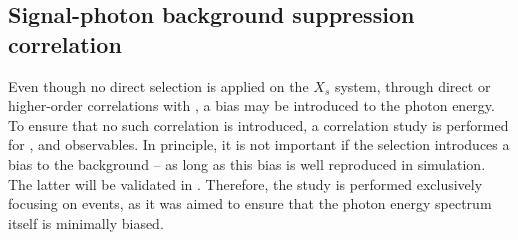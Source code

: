 \subsection{Signal-photon background suppression correlation}\label{sec:signal_photon_correlation}

Even though no direct selection is applied on the $X_s$ system, through direct or higher-order correlations with \EB, a bias may be introduced to the photon energy.
To ensure that no such correlation is introduced, a correlation study is performed for \piVeto, \etaVeto and \ZMVA observables.
In principle, it is not important if the selection introduces a bias to the background -- as long as this bias is well reproduced in simulation.
The latter will be validated in .
Therefore, the study is performed exclusively focusing on \BtoXsgamma events, as it was aimed to ensure that the photon energy spectrum itself is minimally biased.

